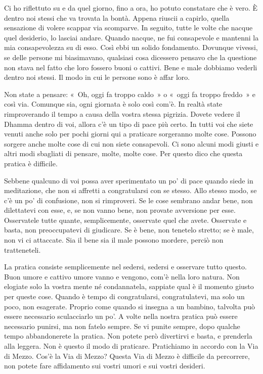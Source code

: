 Ci ho riflettuto su e da quel giorno, fino a ora, ho potuto constatare
che è vero. È dentro noi stessi che va trovata la bontà. Appena riuscii
a capirlo, quella sensazione di volere scappar via scomparve. In
seguito, tutte le volte che nacque quel desiderio, lo lasciai andare.
Quando nacque, ne fui consapevole e mantenni la mia consapevolezza su di
esso. Così ebbi un solido fondamento. Dovunque vivessi, se delle persone
mi biasimavano, qualsiasi cosa dicessero pensavo che la questione non
stava nel fatto che loro fossero buoni o cattivi. Bene e male dobbiamo
vederli dentro noi stessi. Il modo in cui le persone sono è affar loro.

Non state a pensare: «~Oh, oggi fa troppo caldo~» o «~oggi fa troppo
freddo~» e così via. Comunque sia, ogni giornata è solo così com'è. In
realtà state rimproverando il tempo a causa della vostra stessa
pigrizia. Dovete vedere il Dhamma dentro di voi, allora c'è un tipo di
pace più certo. In tutti voi che siete venuti anche solo per pochi
giorni qui a praticare sorgeranno molte cose. Possono sorgere anche
molte cose di cui non siete consapevoli. Ci sono alcuni modi giusti e
altri modi sbagliati di pensare, molte, molte cose. Per questo dico che
questa pratica è difficile.

Sebbene qualcuno di voi possa aver sperimentato un po' di pace quando
siede in meditazione, che non si affretti a congratularsi con se stesso.
Allo stesso modo, se c'è un po' di confusione, non si rimproveri. Se le
cose sembrano andar bene, non dilettatevi con esse, e, se non vanno
bene, non provate avversione per esse. Osservatele tutte quante,
semplicemente, osservate quel che avete. Osservate e basta, non
preoccupatevi di giudicare. Se è bene, non tenetelo stretto; se è male,
non vi ci attaccate. Sia il bene sia il male possono mordere, perciò non
tratteneteli.

La pratica consiste semplicemente nel sedersi, sedersi e osservare tutto
questo. Buon umore e cattivo umore vanno e vengono, com'è nella loro
natura. Non elogiate solo la vostra mente né condannatela, sappiate qual
è il momento giusto per queste cose. Quando è tempo di congratularsi,
congratulatevi, ma solo un poco, non esagerate. Proprio come quando si
insegna a un bambino, talvolta può essere necessario sculacciarlo un
po'. A volte nella nostra pratica può essere necessario punirsi, ma non
fatelo sempre. Se vi punite sempre, dopo qualche tempo abbandonerete la
pratica. Non potete però divertirvi e basta, e prenderla alla leggera.
Non è questo il modo di praticare. Pratichiamo in accordo con la Via di
Mezzo. Cos'è la Via di Mezzo? Questa Via di Mezzo è difficile da
percorrere, non potete fare affidamento sui vostri umori e sui vostri
desideri.

